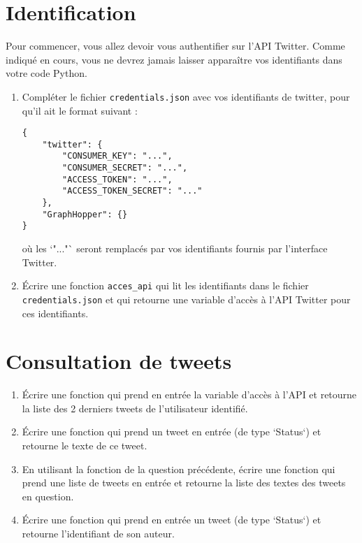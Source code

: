 \documentclass[11pt,a4paper]{article}
\begin{document}
\section{Identification}

Pour commencer, vous allez devoir vous authentifier sur l'API Twitter. Comme indiqué en cours, vous ne devrez jamais laisser apparaître vos identifiants dans votre code Python.

\begin{enumerate}
    \item Compléter le fichier \verb+credentials.json+ avec vos identifiants de twitter, pour qu'il ait le format suivant : 
\begin{verbatim}
{
    "twitter": {
        "CONSUMER_KEY": "...",
        "CONSUMER_SECRET": "...",
        "ACCESS_TOKEN": "...",
        "ACCESS_TOKEN_SECRET": "..."
    },
    "GraphHopper": {}
}

\end{verbatim}
où les `"..."` seront remplacés par vos identifiants fournis par l'interface Twitter.
\item Écrire une fonction \verb+acces_api+ qui lit les identifiants dans le fichier \verb+credentials.json+ et qui retourne une variable d'accès à l'API Twitter pour ces identifiants.
\end{enumerate}

\section{Consultation de tweets}
\begin{enumerate}
    
    
\item  Écrire une fonction qui prend en entrée la variable d'accès à l'API et retourne la liste des 2 derniers tweets de l'utilisateur identifié.

\item Écrire une fonction qui prend un tweet en entrée (de type `Status`) et retourne le texte de ce tweet.

\item En utilisant la fonction de la question précédente, écrire une fonction qui prend une liste de tweets en entrée et retourne la liste des textes des tweets en question.

\item Écrire une fonction qui prend en entrée un tweet (de type `Status`) et retourne l'identifiant de son auteur.

\end{enumerate}
\end{document}
